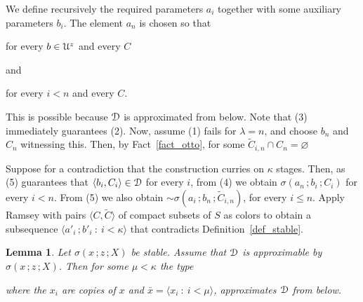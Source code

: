 \documentclass{amsproc}
\makeatletter
\newcounter{thm}
\theoremstyle{mio}
\newtheorem{lemma}[thm]{Lemma}\tcolorboxenvironment{lemma}{mythm}
\providecommand{\proofNameStyle}{\bfseries}
\renewenvironment{proof}[1][\proofname]{\par
  \pushQED{\qed}%
  \normalfont%
  \trivlist
  \item[\hskip\labelsep
        \proofNameStyle
    #1\@addpunct{.}]\ignorespaces
}{%
  \popQED\endtrivlist\@endpefalse
}
\makeatother
\begin{document}
\begin{proof}
  We define recursively the required parameters $a_i$ together with some auxiliary parameters $b_i$.
  The element $a_n$ is chosen so that

\hfill for every $b\in{\EuScript U}^z$ and every $C$

and

\hfill for every $i<n$ and every $C$.\smallskip

This is possible because ${\EuScript D}$ is approximated from below.
Note that (3) immediately guarantees (2).
Now, assume (1) fails for $\lambda=n$, and choose $b_n$ and $C_n$ witnessing this.
Then, by Fact~\ref{fact_otto}, for some $\tilde C_{i,n}\cap C_n=\varnothing$


Suppose for a contradiction that the construction curries on $\kappa$ stages.
Then, as (5) guarantees that $\langle b_i,C_i\rangle\in{\EuScript D}$ for every $i$, from (4) we obtain $\sigma(a_n\,;b_i\,;C_i)$ for every $i<n$.
From (5) we also obtain ${\sim}\sigma(a_i\,;b_n\,;\tilde C_{i,n})$, for every $i\le n$.
Apply Ramsey with pairs $\langle C,\tilde C\rangle$ of compact subsets of $S$ as colors to obtain a subsequence $\langle a'_i\,;b'_i\ :\ i<\kappa\rangle$ that contradicts Definition~\ref{def_stable}.
\end{proof}

\begin{lemma}
  Let $\sigma(x\,;z\,;X)$ be stable.
  Assume that ${\EuScript D}$ is approximable by $\sigma(x\,;z\,;X)$.
  Then for some $\mu<\kappa$ the type\medskip 

  \smallskip
  
  where the $x_i$ are copies of $x$ and $\bar x=\langle x_i\ :\ i<\mu\rangle$,
  approximates ${\EuScript D}$ from below.
\end{lemma}
\end{document}

